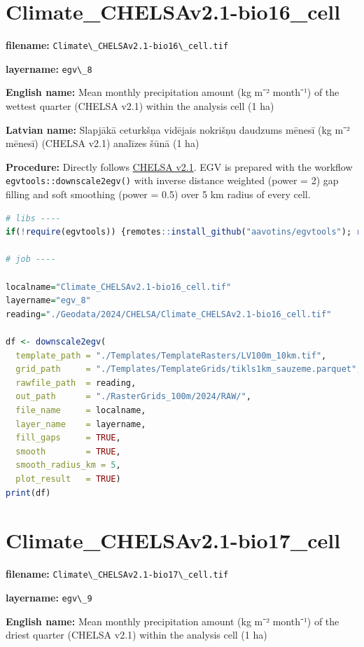 \documentclass[
]{book}
\newcommand{\passthrough}[1]{#1}
\begin{document}
\section{Climate\_CHELSAv2.1-bio16\_cell}\label{ch06.008}

\textbf{filename:} \passthrough{\lstinline!Climate\_CHELSAv2.1-bio16\_cell.tif!}

\textbf{layername:} \passthrough{\lstinline!egv\_8!}

\textbf{English name:} Mean monthly precipitation amount (kg m⁻² month⁻¹) of the wettest quarter (CHELSA v2.1) within the analysis cell (1 ha)

\textbf{Latvian name:} Slapjākā ceturkšņa vidējais nokrišņu daudzums mēnesī (kg m⁻² mēnesī) (CHELSA v2.1) analīzes šūnā (1 ha)

\textbf{Procedure:} Directly follows \hyperref[Ch04.11]{CHELSA v2.1}. EGV is prepared with the
workflow \passthrough{\lstinline!egvtools::downscale2egv()!} with inverse distance weighted (power = 2)
gap filling and soft smoothing (power = 0.5) over 5 km radius of every cell.

\begin{lstlisting}[language=R]
# libs ----
if(!require(egvtools)) {remotes::install_github("aavotins/egvtools"); require(egvtools)}

# job ----

localname="Climate_CHELSAv2.1-bio16_cell.tif"
layername="egv_8"
reading="./Geodata/2024/CHELSA/Climate_CHELSAv2.1-bio16_cell.tif"

df <- downscale2egv(
  template_path = "./Templates/TemplateRasters/LV100m_10km.tif",
  grid_path     = "./Templates/TemplateGrids/tikls1km_sauzeme.parquet",
  rawfile_path  = reading,
  out_path      = "./RasterGrids_100m/2024/RAW/",
  file_name     = localname,
  layer_name    = layername,
  fill_gaps     = TRUE,
  smooth        = TRUE,
  smooth_radius_km = 5,
  plot_result   = TRUE)
print(df)
\end{lstlisting}

\section{Climate\_CHELSAv2.1-bio17\_cell}\label{ch06.009}

\textbf{filename:} \passthrough{\lstinline!Climate\_CHELSAv2.1-bio17\_cell.tif!}

\textbf{layername:} \passthrough{\lstinline!egv\_9!}

\textbf{English name:} Mean monthly precipitation amount (kg m⁻² month⁻¹) of the driest quarter (CHELSA v2.1) within the analysis cell (1 ha)
\end{document}
